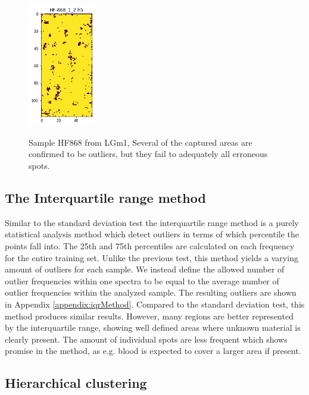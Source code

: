 \begin{figure}[H]
	\centering
{\includegraphics[width=3cm]{images/STDtest/LGm-1/HF-868_1_2.h5_0.png} }
\caption{Sample HF868 from LGm1, Several of the captured areas are confirmed to be outliers, but they fail to adequately all erroneous spots.
\label{fig:stdHF868}}

\end{figure}


\subsection{The Interquartile range method}

Similar to the standard deviation test the interquartile range method is a purely statistical analysis method which detect outliers in terms of which percentile the points fall into. The 25th and 75th percentiles are calculated on each frequency for the entire training set. Unlike the previous test, this method yields a varying amount of outliers for each sample. We instead define the allowed number of outlier frequencies within one spectra to be equal to the average number of outlier frequencies within the analyzed sample. The resulting outliers are shown in Appendix \ref{appendix:iqrMethod}. Compared to the standard deviation test, this method produces similar results. However, many regions are better represented by the interquartile range, showing well defined areas where unknown material is clearly present. The amount of individual spots are less frequent which shows promise in the method, as e.g. blood is expected to cover a larger area if present.

\subsection{Hierarchical clustering}

